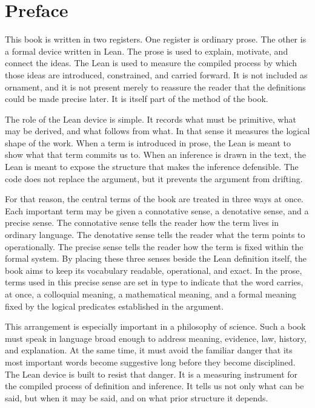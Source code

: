 \chapter*{Preface}

This book is written in two registers. One register is ordinary prose. The
other is a formal device written in Lean. The prose is used to explain,
motivate, and connect the ideas. The Lean is used to measure the compiled
process by which those ideas are introduced, constrained, and carried forward.
It is not included as ornament, and it is not present merely to reassure the
reader that the definitions could be made precise later. It is itself part of
the method of the book.

The role of the Lean device is simple. It records what must be primitive, what
may be derived, and what follows from what. In that sense it measures the
logical shape of the work. When a term is introduced in prose, the Lean is
meant to show what that term commits us to. When an inference is drawn in the
text, the Lean is meant to expose the structure that makes the inference
defensible. The code does not replace the argument, but it prevents the
argument from drifting.

For that reason, the central terms of the book are treated in three ways at
once. Each important term may be given a connotative sense, a denotative
sense, and a precise sense. The connotative sense tells the reader how the
term lives in ordinary language. The denotative sense tells the reader what
the term points to operationally. The precise sense tells the reader how the
term is fixed within the formal system. By placing these three senses beside
the Lean definition itself, the book aims to keep its vocabulary readable,
operational, and exact. In the prose, terms used in this precise sense are
set in  type to indicate that the word carries, at once, a
colloquial meaning, a mathematical meaning, and a formal meaning fixed by
the logical predicates established in the argument.

This arrangement is especially important in a philosophy of science. Such a
book must speak in language broad enough to address meaning, evidence, law,
history, and explanation. At the same time, it must avoid the familiar danger
that its most important words become suggestive long before they become
disciplined. The Lean device is built to resist that danger. It is a measuring
instrument for the compiled process of definition and inference. It tells us
not only what can be said, but when it may be said, and on what prior
structure it depends.

